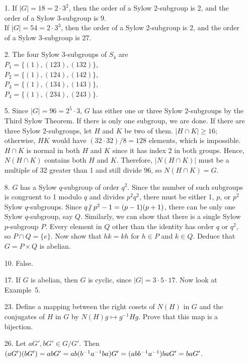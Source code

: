 {\small
\begin{itemize}
 
\bf\item[1.]\rm
If $|G| = 18 = 2 \cdot 3^2$, then the order of a Sylow 2-subgroup is 2,
and the order of a Sylow 3-subgroup is 9. \\
If $|G| = 54 = 2 \cdot 3^3$, then the order of a Sylow 2-subgroup is 2,
and the order of a Sylow 3-subgroup is 27. 
 
 
\bf\item[2.]\rm
The four Sylow 3-subgroups of $S_4$ are \\
$P_1 = \{ (1), (123), (132) \}$,\\
$P_2 = \{ (1), (124), (142) \}$,\\
$P_3 = \{ (1), (134), (143) \}$,\\
$P_4 = \{ (1), (234), (243) \}$.
 
 
\bf\item[5.]\rm
Since $|G| = 96 = 2^5 \cdot 3$, $G$ has either one or three Sylow
2-subgroups by the Third Sylow Theorem. If there is only one subgroup,
we are done. If there are three Sylow 2-subgroups, let $H$ and $K$ be two
of them. $|H \cap K| \geq 16$; otherwise, $HK$ would have $(32 \cdot
32)/8 = 128$ elements, which is impossible. $H \cap K$ is normal in
both $H$ and $K$ since it has index 2 in both groups. Hence, $N(H \cap
K)$ contains both $H$ and $K$. Therefore, $|N(H \cap K)|$ must be a
multiple of 32 greater than 1 and still divide 96, so $N( H \cap K)
= G$. 
 
 
\bf\item[8.]\rm
$G$ has a Sylow $q$-subgroup of order $q^2$. Since the number of such
subgroups is congruent to 1 modulo $q$ and divides $p^2 q^2$, there
must be either 1, $p$, or $p^2$ Sylow $q$-subgroups. Since $q {\not\:\mid\ }
p^2 -1 = (p-1)(p + 1)$, there can be only one Sylow $q$-subgroup, say
$Q$. Similarly, we can show that there is a single Sylow $p$-subgroup
$P$. Every element in $Q$ other than the identity has order $q$ or
$q^2$, so $P \cap Q = \{ e \}$. Now show that $hk = kh$ for $h \in P$
and $k \in Q$. Deduce that $G = P \times Q$ is abelian.
 
 
\bf\item[10.]\rm
False.
 
 
\bf\item[17.]\rm
If $G$ is abelian, then $G$ is cyclic, since $|G| = 3 \cdot 5 \cdot
17$. Now look at Example~5.
 
 
\bf\item[23.]\rm
Define a mapping between the right cosets of $N(H)$ in $G$ and the
conjugates of $H$ in $G$ by $N(H) g \mapsto g^{-1} H g$. Prove that
this map is a bijection.
 
 
\bf\item[26.]\rm
Let $a G', b G' \in G/G'$. Then $(a G')( b G') = ab G' =
ab(b^{-1}a^{-1}ba) G' = \\ (abb^{-1}a^{-1})ba G' =  ba G'$.
 
 
 
\end{itemize}
}
 
